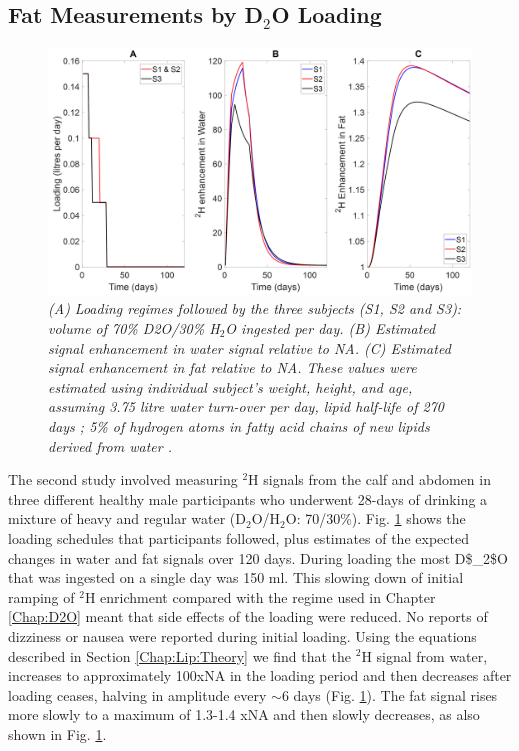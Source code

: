 \subsection{Fat Measurements by D$_2$O Loading}

\begin{figure}
    \centering
    \includegraphics[width=1\textwidth]{Figures/Lipid/Loading_Routine.png}
    \caption{\textit{(A) Loading regimes followed by the three subjects (S1, S2 and S3): volume of 70\% D2O/30\% H$_2$O ingested per day. (B) Estimated signal enhancement in water signal relative to NA. (C) Estimated signal enhancement in fat relative to NA. These values were estimated using individual subject’s weight, height, and age, assuming 3.75 litre water turn-over per day, lipid half-life of 270 days \cite{Arner2011DynamicsDisease, Spalding2017ImpactTissue}; 5\% of hydrogen atoms in fatty acid chains of new lipids derived from water \cite{Turner2003MeasurementMIDA}.}}
    \label{fig:Lip:Load}
\end{figure}

The second study involved measuring $^2$H signals from the calf and abdomen in three different healthy male participants who underwent 28-days of drinking a mixture of heavy and regular water (D$_2$O/H$_2$O: 70/30\%). Fig. \ref{fig:Lip:Load} shows the loading schedules that participants followed, plus estimates of the expected changes in water and fat signals over 120 days. During loading the most \ac{D$_2$O} that was ingested on a single day was 150 ml. This slowing down of initial ramping of $^2$H enrichment compared with the regime used in Chapter \ref{Chap:D2O} meant that side effects of the loading were reduced. No reports of dizziness or nausea were reported during initial loading. Using the equations described in Section \ref{Chap:Lip:Theory} we find that the $^2$H signal from water, increases to approximately 100x\ac{NA} in the loading period and then decreases after loading ceases, halving in amplitude every $\sim$6 days (Fig. \ref{fig:Lip:Load}). The fat signal rises more slowly to a maximum of 1.3-1.4 x\ac{NA} and then slowly decreases, as also shown in Fig. \ref{fig:Lip:Load}.

